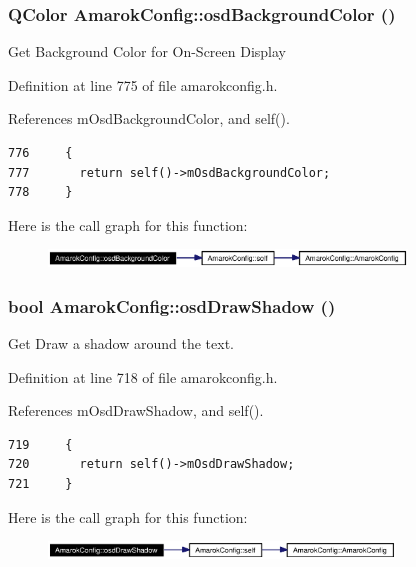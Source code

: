 \subsubsection{\setlength{\rightskip}{0pt plus 5cm}QColor Amarok\-Config::osd\-Background\-Color ()\hspace{0.3cm}{\tt  [inline, static]}}\label{classAmarokConfig_AmarokConfige80}


Get Background Color for On-Screen Display 

Definition at line 775 of file amarokconfig.h.

References m\-Osd\-Background\-Color, and self().



\footnotesize\begin{verbatim}776     {
777       return self()->mOsdBackgroundColor;
778     }
\end{verbatim}\normalsize 


Here is the call graph for this function:\begin{figure}[H]
\begin{center}
\leavevmode
\includegraphics[width=270pt]{classAmarokConfig_AmarokConfige80_cgraph}
\end{center}
\end{figure}
\subsubsection{\setlength{\rightskip}{0pt plus 5cm}bool Amarok\-Config::osd\-Draw\-Shadow ()\hspace{0.3cm}{\tt  [inline, static]}}\label{classAmarokConfig_AmarokConfige74}


Get Draw a shadow around the text. 

Definition at line 718 of file amarokconfig.h.

References m\-Osd\-Draw\-Shadow, and self().



\footnotesize\begin{verbatim}719     {
720       return self()->mOsdDrawShadow;
721     }
\end{verbatim}\normalsize 


Here is the call graph for this function:\begin{figure}[H]
\begin{center}
\leavevmode
\includegraphics[width=261pt]{classAmarokConfig_AmarokConfige74_cgraph}
\end{center}
\end{figure}

